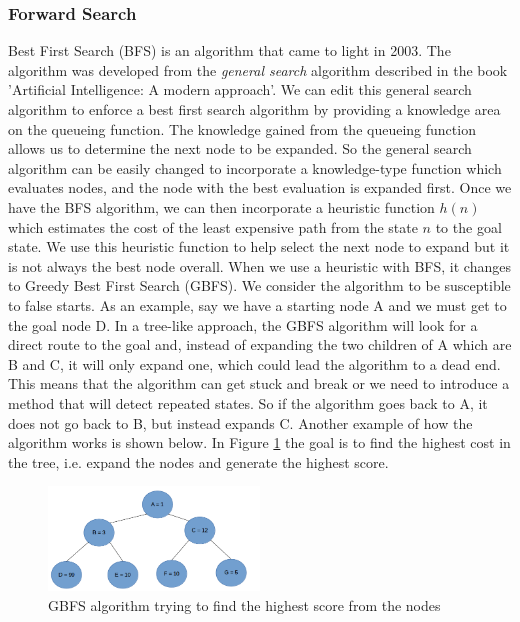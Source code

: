 \subsubsection{Forward Search}

Best First Search (BFS) is an algorithm that came to light in 2003. The algorithm was developed from the \textit{general search} algorithm described in the book 'Artificial Intelligence: A modern approach'. We can edit this general search algorithm to enforce a best first search algorithm by providing a knowledge area on the queueing function\cite{AModernApproach}. The knowledge gained from the queueing function allows us to determine the next node to be expanded. So the general search algorithm can be easily changed to incorporate a knowledge-type function which evaluates nodes, and the node with the best evaluation is expanded first. 
Once we have the BFS algorithm, we can then incorporate a heuristic function $h(n)$ which estimates the cost of the least expensive path from the state $n$ to the goal state. We use this heuristic function to help select the next node to expand but it is not always the best node overall. When we use a heuristic with BFS, it changes to Greedy Best First Search (GBFS). We consider the algorithm to be susceptible to false starts\cite{StochasticHillClimb}. As an example, say we have a starting node A and we must get to the goal node D. In a tree-like approach, the GBFS algorithm will look for a direct route to the goal and, instead of expanding the two children of A which are B and C, it will only expand one, which could lead the algorithm to a dead end. This means that the algorithm can get stuck and break or we need to introduce a method that will detect repeated states. So if the algorithm goes back to A, it does not go back to B, but instead expands C. 
Another example of how the algorithm works is shown below. In Figure \ref{fig:GBFSTree} the goal is to find the highest cost in the tree, i.e. expand the nodes and generate the highest score.
\\ 
\begin{figure}[!htb]
    \centering
    \includegraphics[scale=1.5,width=0.50\textwidth]{GBFSTree.png}
    \caption{GBFS algorithm trying to find the highest score from the nodes}
    \label{fig:GBFSTree}
\end{figure}
